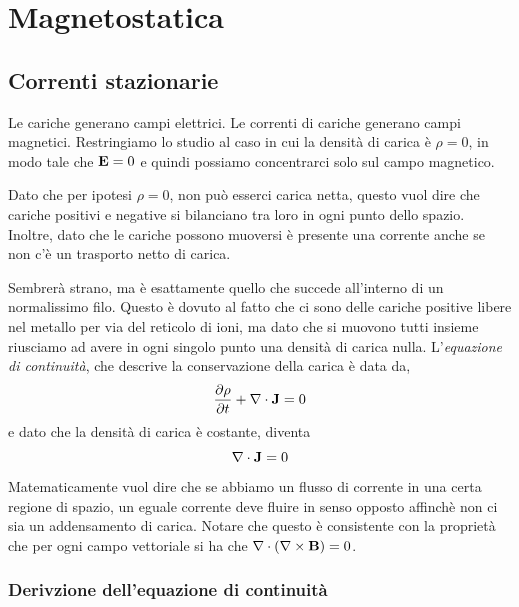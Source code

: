 \setcounter{chapter}{1}
\chapter{Magnetostatica}

\section{Correnti stazionarie}

Le cariche generano campi elettrici. Le correnti di cariche generano campi magnetici. Restringiamo lo studio al caso in cui la densit\`a di carica \`e $\rho = 0$, in modo tale che $\bold{E} = 0$ e quindi possiamo concentrarci solo sul campo magnetico. 

Dato che per ipotesi $\rho = 0$, non pu\`o esserci carica netta, questo vuol dire che cariche positivi e negative si bilanciano tra loro in ogni punto dello spazio. Inoltre, dato che le cariche possono muoversi \`e presente una corrente anche se non c'\`e un trasporto netto di carica.
\newline

Sembrer\`a strano, ma \`e esattamente quello che succede all'interno di un normalissimo filo. Questo \`e dovuto al fatto che ci sono delle cariche positive libere nel metallo per via del reticolo di ioni, ma dato che si muovono tutti insieme riusciamo ad avere in ogni singolo punto una densit\`a di carica nulla. L'\textit{equazione di continuit\`a}, che descrive la conservazione della carica \`e data da, 
\begin{equation}
	\frac{\partial \rho}{\partial t} + \nabla \cdot \bold{J} = 0
\end{equation}
e dato che la densit\`a di carica \`e costante, diventa 
\begin{equation*}
	\nabla \cdot \bold{J} = 0
\end{equation*}
Matematicamente vuol dire che se abbiamo un flusso di corrente in una certa regione di spazio, un eguale corrente deve fluire in senso opposto affinch\`e non ci sia un addensamento di carica. Notare che questo \`e consistente con la propriet\`a che per ogni campo vettoriale si ha che $\nabla \cdot (\nabla \times \bold{B}) = 0$.

\subsection{Derivzione dell'equazione di continuit\`a}

